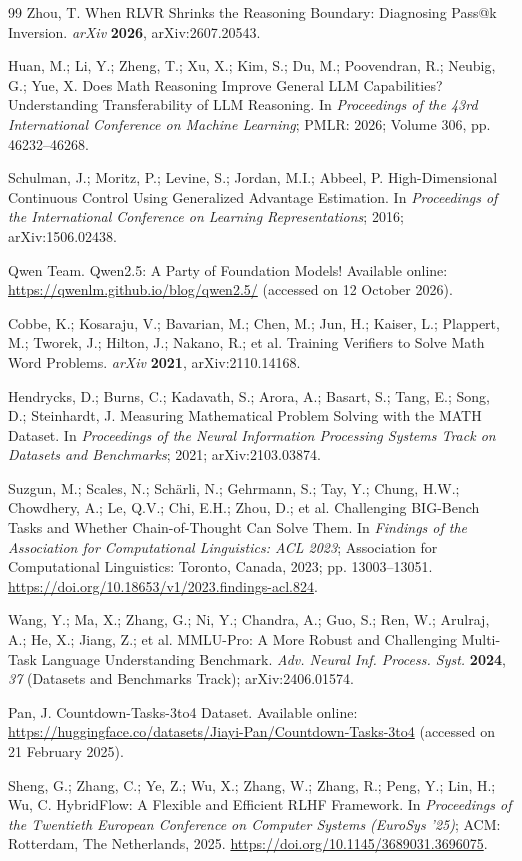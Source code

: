 \begin{thebibliography}{99}
 Zhou, T. When RLVR Shrinks the Reasoning Boundary: Diagnosing Pass@k Inversion. \emph{arXiv} \textbf{2026}, arXiv:2607.20543.

 Huan, M.; Li, Y.; Zheng, T.; Xu, X.; Kim, S.; Du, M.; Poovendran, R.; Neubig, G.; Yue, X. Does Math Reasoning Improve General LLM Capabilities? Understanding Transferability of LLM Reasoning. In \emph{Proceedings of the 43rd International Conference on Machine Learning}; PMLR: 2026; Volume 306, pp. 46232--46268.

 Schulman, J.; Moritz, P.; Levine, S.; Jordan, M.I.; Abbeel, P. High-Dimensional Continuous Control Using Generalized Advantage Estimation. In \emph{Proceedings of the International Conference on Learning Representations}; 2016; arXiv:1506.02438.

 Qwen Team. Qwen2.5: A Party of Foundation Models! Available online: \url{https://qwenlm.github.io/blog/qwen2.5/} (accessed on 12 October 2026).

 Cobbe, K.; Kosaraju, V.; Bavarian, M.; Chen, M.; Jun, H.; Kaiser, L.; Plappert, M.; Tworek, J.; Hilton, J.; Nakano, R.; et al. Training Verifiers to Solve Math Word Problems. \emph{arXiv} \textbf{2021}, arXiv:2110.14168.

 Hendrycks, D.; Burns, C.; Kadavath, S.; Arora, A.; Basart, S.; Tang, E.; Song, D.; Steinhardt, J. Measuring Mathematical Problem Solving with the MATH Dataset. In \emph{Proceedings of the Neural Information Processing Systems Track on Datasets and Benchmarks}; 2021; arXiv:2103.03874.

 Suzgun, M.; Scales, N.; Sch{\"a}rli, N.; Gehrmann, S.; Tay, Y.; Chung, H.W.; Chowdhery, A.; Le, Q.V.; Chi, E.H.; Zhou, D.; et al. Challenging BIG-Bench Tasks and Whether Chain-of-Thought Can Solve Them. In \emph{Findings of the Association for Computational Linguistics: ACL 2023}; Association for Computational Linguistics: Toronto, Canada, 2023; pp. 13003--13051. \url{https://doi.org/10.18653/v1/2023.findings-acl.824}.

 Wang, Y.; Ma, X.; Zhang, G.; Ni, Y.; Chandra, A.; Guo, S.; Ren, W.; Arulraj, A.; He, X.; Jiang, Z.; et al. MMLU-Pro: A More Robust and Challenging Multi-Task Language Understanding Benchmark. \emph{Adv. Neural Inf. Process. Syst.} \textbf{2024}, \emph{37} (Datasets and Benchmarks Track); arXiv:2406.01574.

 Pan, J. Countdown-Tasks-3to4 Dataset. Available online: \url{https://huggingface.co/datasets/Jiayi-Pan/Countdown-Tasks-3to4} (accessed on 21 February 2025).

 Sheng, G.; Zhang, C.; Ye, Z.; Wu, X.; Zhang, W.; Zhang, R.; Peng, Y.; Lin, H.; Wu, C. HybridFlow: A Flexible and Efficient RLHF Framework. In \emph{Proceedings of the Twentieth European Conference on Computer Systems (EuroSys '25)}; ACM: Rotterdam, The Netherlands, 2025. \url{https://doi.org/10.1145/3689031.3696075}.

\end{thebibliography}
